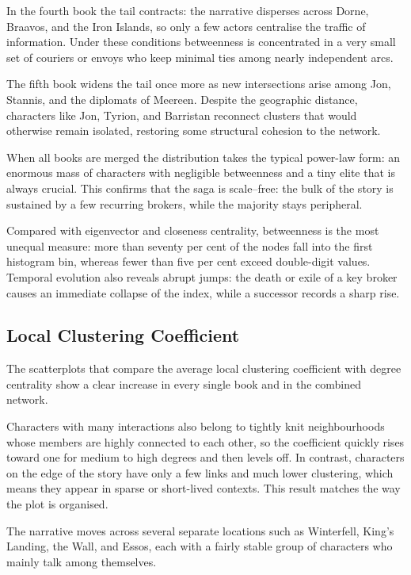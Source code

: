 \documentclass[12pt, a4paper]{article}
\begin{document}
In the fourth book the tail contracts: the narrative disperses across Dorne, Braavos, and the Iron Islands, so only a few actors centralise the traffic of information. Under these conditions betweenness is concentrated in a very small set of couriers or envoys who keep minimal ties among nearly independent arcs.

The fifth book widens the tail once more as new intersections arise among Jon, Stannis, and the diplomats of Meereen. Despite the geographic distance, characters like Jon, Tyrion, and Barristan reconnect clusters that would otherwise remain isolated, restoring some structural cohesion to the network.

When all books are merged the distribution takes the typical power-law form: an enormous mass of characters with negligible betweenness and a tiny elite that is always crucial. This confirms that the saga is scale–free: the bulk of the story is sustained by a few recurring brokers, while the majority stays peripheral.

Compared with eigenvector and closeness centrality, betweenness is the most unequal measure: more than seventy per cent of the nodes fall into the first histogram bin, whereas fewer than five per cent exceed double-digit values. Temporal evolution also reveals abrupt jumps: the death or exile of a key broker causes an immediate collapse of the index, while a successor records a sharp rise.

\subsection*{Local Clustering Coefficient}
The scatterplots that compare the average local clustering coefficient 
with degree centrality show a clear increase in every single book and in the combined network.

Characters with many interactions also belong to tightly knit neighbourhoods whose members
 are highly connected to each other, so the coefficient quickly rises toward one for medium
 to high degrees and then levels off. In contrast, characters on the edge of the story 
 have only a few links and much lower clustering, which means they appear in sparse or 
 short-lived contexts. This result matches the way the plot is organised. 
 
 The narrative moves across several separate locations such as Winterfell, King's Landing, 
 the Wall, and Essos, each with a fairly stable group of characters who mainly talk among 
 themselves.
 
\end{document}
